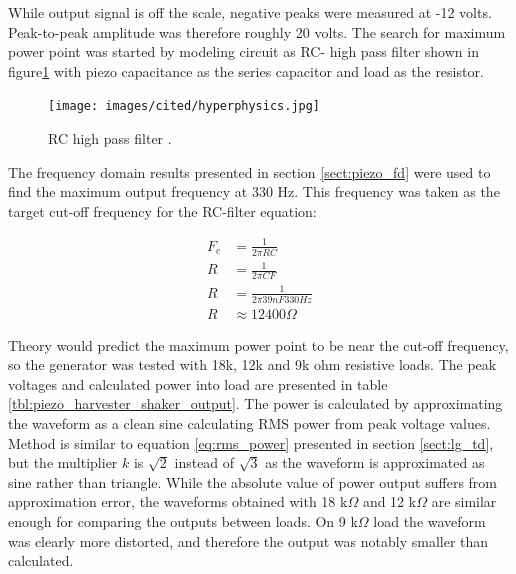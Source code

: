 While output signal is off the scale, negative peaks were measured at -12 volts. Peak-to-peak amplitude was therefore roughly 20 volts. The search for maximum power point was started by modeling circuit as RC- high pass filter shown in figure\ref{fig:rc_highpass} with piezo capacitance as the series capacitor and load as the resistor. 

\begin{figure}[htb]
\begin{center}
\texttt{[image: images/cited/hyperphysics.jpg]}
\end{center}
\caption{\label{fig:rc_highpass} RC high pass filter \cite{hyperphysics}.}
\end{figure}

The frequency domain results presented in section \ref{sect:piezo_fd} were used to find the maximum output frequency at 330 Hz. This frequency was taken as the target cut-off frequency for the RC-filter equation:

\begin{equation}
\begin{split}
  F_c &= \frac{1}{2 \pi R C} \\
  R   &= \frac{1}{2 \pi C F} \\
  R   &= \frac{1}{2 \pi 39 nF 330 Hz} \\
  R   &\approx 12 400 \Omega 
\end{split}
\end{equation}

Theory would predict the maximum power point to be near the cut-off frequency, so the generator was tested with 18k, 12k and 9k ohm resistive loads. The peak voltages and calculated power into load are presented in table \ref{tbl:piezo_harvester_shaker_output}. The power is calculated by approximating the waveform as a clean sine calculating RMS power from peak voltage values. Method is similar to equation \eqref{eq:rms_power} presented in section \ref{sect:lg_td}, but the multiplier $k$ is $\sqrt{2}$ instead of $\sqrt{3}$ as the waveform is approximated as sine rather than triangle. While the absolute value of power output suffers from approximation error, the waveforms obtained with 18 k$\Omega$ and 12 k$\Omega$ are similar enough for comparing the outputs between loads. On 9 k$\Omega$ load the waveform was clearly more distorted, and therefore the output was notably smaller than calculated.

\begin{table}[htb]
\caption{\label{tbl:piezo_harvester_shaker_output} Output power of piezo harvester at various 18k, 12k and 9k $\Omega$ loads.}
\begin{center}
\end{center}
\end{table}

